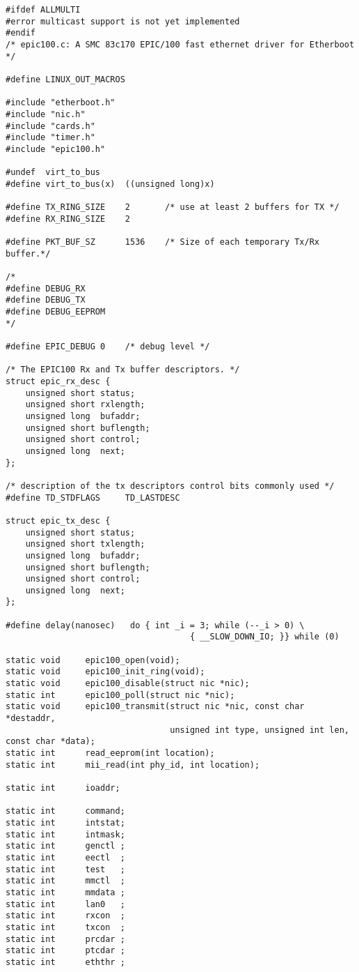 \begin{verbatim}
#ifdef ALLMULTI
#error multicast support is not yet implemented
#endif
/* epic100.c: A SMC 83c170 EPIC/100 fast ethernet driver for Etherboot */

#define LINUX_OUT_MACROS

#include "etherboot.h"
#include "nic.h"
#include "cards.h"
#include "timer.h"
#include "epic100.h"

#undef  virt_to_bus
#define virt_to_bus(x)  ((unsigned long)x)

#define TX_RING_SIZE    2       /* use at least 2 buffers for TX */
#define RX_RING_SIZE    2

#define PKT_BUF_SZ      1536    /* Size of each temporary Tx/Rx buffer.*/

/*
#define DEBUG_RX
#define DEBUG_TX
#define DEBUG_EEPROM
*/

#define EPIC_DEBUG 0    /* debug level */

/* The EPIC100 Rx and Tx buffer descriptors. */
struct epic_rx_desc {
    unsigned short status;
    unsigned short rxlength;
    unsigned long  bufaddr;
    unsigned short buflength;
    unsigned short control;
    unsigned long  next;
};

/* description of the tx descriptors control bits commonly used */
#define TD_STDFLAGS     TD_LASTDESC

struct epic_tx_desc {
    unsigned short status;
    unsigned short txlength;
    unsigned long  bufaddr;
    unsigned short buflength;
    unsigned short control;
    unsigned long  next;
};

#define delay(nanosec)   do { int _i = 3; while (--_i > 0) \
                                     { __SLOW_DOWN_IO; }} while (0)

static void     epic100_open(void);
static void     epic100_init_ring(void);
static void     epic100_disable(struct nic *nic);
static int      epic100_poll(struct nic *nic);
static void     epic100_transmit(struct nic *nic, const char *destaddr,
                                 unsigned int type, unsigned int len, const char *data);
static int      read_eeprom(int location);
static int      mii_read(int phy_id, int location);

static int      ioaddr;

static int      command;
static int      intstat;
static int      intmask;
static int      genctl ;
static int      eectl  ;
static int      test   ;
static int      mmctl  ;
static int      mmdata ;
static int      lan0   ;
static int      rxcon  ;
static int      txcon  ;
static int      prcdar ;
static int      ptcdar ;
static int      eththr ;


\end{verbatim}
